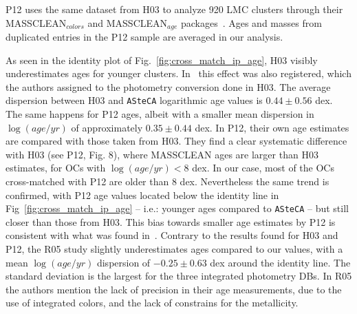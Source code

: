 \documentclass{aa}
\begin{document}
P12 uses the same dataset from H03 to analyze 920 LMC clusters through their
MASSCLEAN$_{colors}$ and MASSCLEAN$_{age}$
packages~\citep{Popescu_2010a,Popescu_2010b}. Ages and masses from duplicated
entries in the P12 sample are averaged in our analysis.


As seen in the identity plot of Fig.~\ref{fig:cross_match_ip_age}, H03
visibly underestimates ages for younger clusters.
In~\citet[][see Fig. 1]{de_Grijs_2006} this effect was also registered, which
the authors assigned to the photometry conversion done in H03. The average
dispersion between H03 and \texttt{ASteCA} logarithmic age values is
$0.44{\pm}0.56$ dex.
%
The same happens for P12 ages, albeit with a smaller mean dispersion in
$\log(age/yr)$ of approximately $0.35{\pm}0.44$ dex.
In P12, their own age estimates are compared with those taken from H03.
They find a clear systematic difference with H03 (see P12, Fig. 8),
where MASSCLEAN ages are larger than H03 estimates, for OCs with
$\log(age/yr){<}8$ dex. In our case, most of the OCs cross-matched with P12 are
older than 8 dex. Nevertheless the same trend is confirmed, with P12 age values
located below the identity line in Fig~\ref{fig:cross_match_ip_age} -- i.e.:
younger ages compared to \texttt{ASteCA} -- but still closer than those from
H03. This bias towards smaller age estimates by P12 is consistent with what was
found in~\cite{Choudhury_2015}.
%
Contrary to the results found for H03 and P12, the R05 study slightly
underestimates ages compared to our values, with a mean $\log(age/yr)$
dispersion of $-0.25{\pm}0.63$ dex around the identity line. The standard
deviation is the largest for the three integrated photometry DBs. In R05 the
authors mention the lack of precision in their age measurements, due to the use
of integrated colors, and the lack of constrains for the metallicity.
\end{document}
